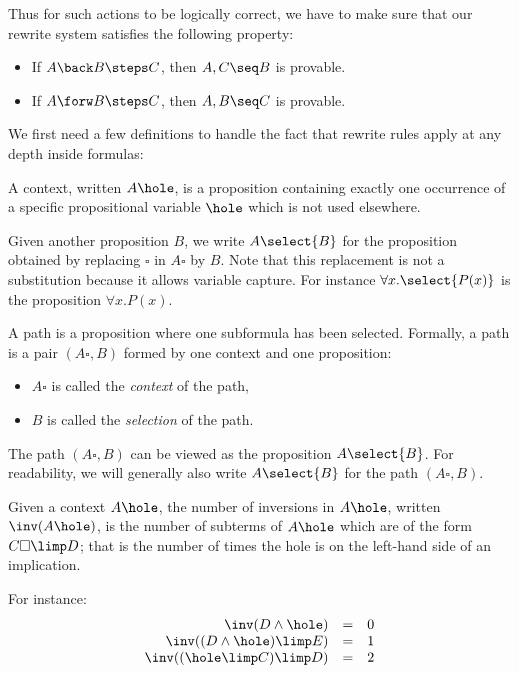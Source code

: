Thus for such actions to be logically correct, we have to make sure that our
rewrite system satisfies the following property:

\begin{theorem}[Correctness]\label{prop:correctness}
  \phantom{a}
  \begin{itemize}
    \item If $A \back B \steps C$, then $A, C \seq B$ is provable.
    \item If $A \forw B \steps C$, then $A, B \seq C$ is provable.
  \end{itemize}
\end{theorem}

We first need a few definitions to handle the fact that rewrite rules apply at
any depth inside formulas:

\begin{definition}[Context]\label{def:context}
  A context, written $A\hole$, is a proposition containing exactly
  one occurrence of a specific propositional variable $\hole$ which is
  not used elsewhere.

  Given another proposition $B$, we write $A\select{B}$ for the
  proposition obtained by replacing $\square$ in $A\square$ by $B$. Note
  that this replacement is not a substitution because it allows variable
  capture. For instance $\forall x.\select{P(x)}$ is the proposition
  $\forall x.P(x)$.
\end{definition}

\begin{definition}[Path]\label{def:path}
A path is a proposition where one subformula has been
selected. Formally, a path is a pair $(A\square, B)$ formed by one
context and one proposition:
\begin{itemize}
\item $A\square$ is called the {\em context} of the path,
\item $B$ is called the {\em selection} of the path.
\end{itemize}

The path $(A\square, B)$ can be viewed as the proposition
$A\select{B}$.  For readability, we will generally also write
$A\select{B}$ for the path $(A\square, B)$.
\end{definition}

\begin{definition}[Inversions]
  Given a context $A\hole$, the number of inversions in $A\hole$,
  written $\inv(A\hole)$, is the number of subterms of $A\hole$
  which are of the form $C\square\limp D$; that is the number of
  times the hole is on the left-hand side of an implication.
  \end{definition}
\noindent  For instance:
  $$
\begin{array}{rcl}
    \inv(D\land \hole)&=& 0\\
    \inv((D\land \hole)\limp E)&=&1\\
    \inv((\hole\limp C)\limp D) &=& 2
\end{array}
$$

